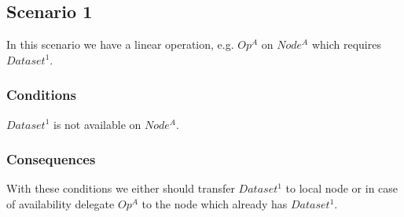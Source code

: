 \subsection{Scenario 1}
In this scenario we have a linear operation, e.g. \(Op^A\) on \(Node^A\) which
requires \( Dataset^1 \).

\subsubsection{Conditions} \( Dataset^1 \) is not available on \( Node^A \).
\subsubsection{Consequences} With these conditions we either should transfer \( Dataset^1 \)
to local node or in case of availability delegate \(Op^A\) to the node which already has \( Dataset^1 \).